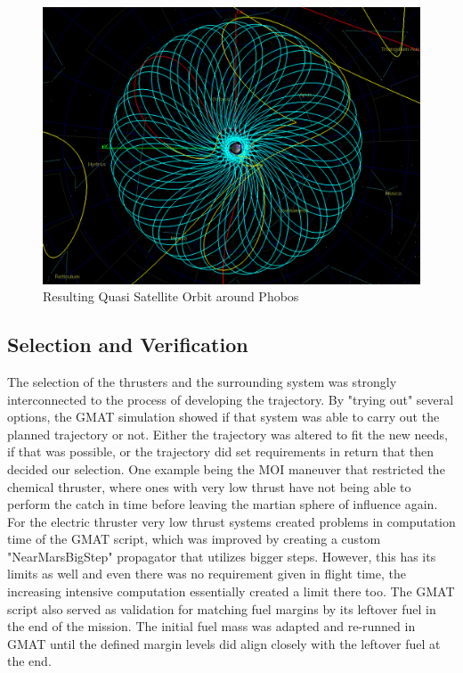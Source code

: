 \begin{figure}[H]
  \centering
  \includegraphics[width=\linewidth]{img/gmat_orbit.png}
  \caption{Resulting Quasi Satellite Orbit around Phobos}
  \label{fig:gmat-orbit}
\end{figure}

\subsection{Selection and Verification}
The selection of the thrusters and the surrounding system was strongly interconnected to the process of developing the trajectory.
By "trying out" several options, the GMAT simulation showed if that system was able to carry out the planned trajectory or not.
Either the trajectory was altered to fit the new needs, if that was possible, or the trajectory did set requirements in return that then decided our selection.
One example being the MOI maneuver that restricted the chemical thruster, where ones with very low thrust have not being able to perform the catch in time before leaving the martian sphere of influence again.
For the electric thruster very low thrust systems created problems in computation time of the GMAT script, which was improved by creating a custom "NearMarsBigStep" propagator that utilizes bigger steps. However, this has its limits as well and even there was no requirement given in flight time, the increasing intensive computation essentially created a limit there too.
The GMAT script also served as validation for matching fuel margins by its leftover fuel in the end of the mission.
The initial fuel mass was adapted and re-runned in GMAT until the defined margin levels did align closely with the leftover fuel at the end.

